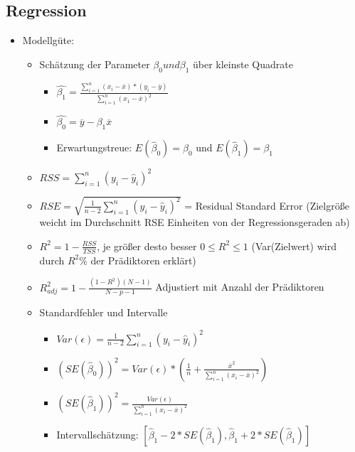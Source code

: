 \documentclass[a4paper]{article}
\begin{document}
\begin{landscape}
\begin{multicols}{3}
        \section{Regression}
        \begin{itemize}[noitemsep,nolistsep,leftmargin=*]
            \item Modellgüte:
            \begin{itemize}[noitemsep,nolistsep,leftmargin=*]
                \item Schätzung der Parameter $\beta_0 und \beta_1$ über kleinste Quadrate
                \begin{itemize}[noitemsep,nolistsep,leftmargin=*]
                    \item $\hat{\beta_1} = \frac{\sum_{i=1}^{n}(x_i-\overline{x})*(y_i-\overline{y})}{\sum_{i=1}^{n}(x_1-\overline{x})^2}$ 
                    \item $\hat{\beta_0} = \overline{y} - \beta_1\overline{x}$
                    \item Erwartungstreue: $E(\hat{\beta}_0) = \beta_0$ und $E(\hat{\beta}_1) = \beta_1$
                \end{itemize}
                \item $RSS = \sum_{i=1}^{n}(y_i-\hat{y}_i)^2$
                \item $RSE = \sqrt{\frac{1}{n-2}\sum_{i=1}^{n}(y_i-\hat{y}_i)^2}$ = Residual Standard Error (Zielgröße weicht im Durchschnitt RSE Einheiten von der Regressionsgeraden ab)
                \item $R^2 = 1 - \frac{RSS}{TSS}$, je größer desto besser $0 \leq R^2 \leq 1$ (Var(Zielwert) wird durch $R^2\%$ der Prädiktoren erklärt)
                \item $R^2_{adj} = 1- \frac{(1-R^2)(N-1)}{N-p-1}$ Adjustiert mit Anzahl der Prädiktoren
                \item Standardfehler und Intervalle
                \begin{itemize}[noitemsep,nolistsep,leftmargin=*]
                    \item $Var(\epsilon)=\frac{1}{n-2}\sum_{i=1}^{n}(y_i-\hat{y}_i)^2$
                    \item $(SE(\hat{\beta}_0))^2 = Var(\epsilon)*(\frac{1}{n}+\frac{\overline{x}^2}{\sum_{i=1}^{n}(x_i-\overline{x})^2})$
                    \item $(SE(\hat{\beta}_1))^2 = \frac{Var(\epsilon)}{\sum_{i=1}^{n}(x_i-\overline{x})^2}$
                    \item Intervallschätzung: $[\hat{\beta}_1-2*SE(\hat{\beta}_1), \hat{\beta}_1+2*SE(\hat{\beta}_1)]$

\end{itemize}
\end{itemize}
\end{itemize}
\end{multicols}
\end{landscape}
\end{document}
